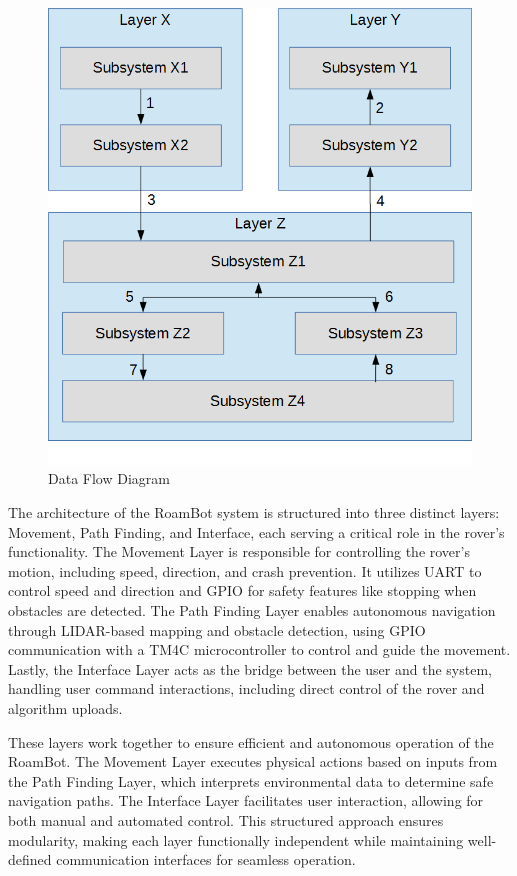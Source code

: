 
\begin{figure}[h!]
	\centering
 	\includegraphics[width=1\textwidth]{images/data_flow}
 \caption{Data Flow Diagram}
\end{figure}

The architecture of the RoamBot system is structured into three distinct layers: Movement, Path Finding, and Interface, each serving a critical role in the rover's functionality. The Movement Layer is responsible for controlling the rover's motion, including speed, direction, and crash prevention. It utilizes UART to control speed and direction and GPIO for safety features like stopping when obstacles are detected. The Path Finding Layer enables autonomous navigation through LIDAR-based mapping and obstacle detection, using GPIO communication with a TM4C microcontroller to control and guide the movement. Lastly, the Interface Layer acts as the bridge between the user and the system, handling user command interactions, including direct control of the rover and algorithm uploads.

These layers work together to ensure efficient and autonomous operation of the RoamBot. The Movement Layer executes physical actions based on inputs from the Path Finding Layer, which interprets environmental data to determine safe navigation paths. The Interface Layer facilitates user interaction, allowing for both manual and automated control. This structured approach ensures modularity, making each layer functionally independent while maintaining well-defined communication interfaces for seamless operation.
